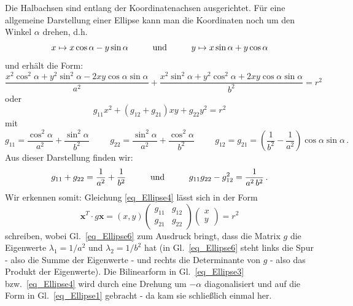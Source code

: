 Die Halbachsen sind entlang der Koordinatenachsen ausgerichtet.
F\"ur eine allgemeine Darstellung einer Ellipse kann man die Koordinaten noch um den Winkel $\alpha$
drehen, d.h.
\begin{equation}
\label{eq_Ellipse2}
        x \mapsto  x\cos \alpha  - y \sin \alpha   \hspace{1cm} {\rm und} \hspace{1cm}
        y \mapsto  x\sin \alpha + y \cos \alpha    
\end{equation}
und erh\"alt die Form:
\begin{equation}
\label{eq_Ellipse3}
             \frac{x^2 \cos^2 \alpha + y^2 \sin^2 \alpha - 2xy \cos \alpha \sin \alpha}{a^2} + 
             \frac{x^2 \sin^2 \alpha + y^2 \cos^2 \alpha + 2xy \cos \alpha \sin \alpha}{b^2} = r^2 
\end{equation}
oder
\begin{equation}
\label{eq_Ellipse4}
            g_{11} x^2 +  (g_{12}+g_{21})  xy + g_{22} y^2 = r^2 
\end{equation}
mit
\begin{equation}
\label{eq_Ellipse5}
            g_{11} = \frac{\cos^2 \alpha}{a^2} + \frac{\sin^2 \alpha}{b^2}   \hspace{1cm}
            g_{22} = \frac{\sin^2 \alpha}{a^2} + \frac{\cos^2 \alpha}{b^2}   \hspace{1cm}
            g_{12} = g_{21} = \left( \frac{1}{b^2} - \frac{1}{a^2}  \right) \cos \alpha \sin \alpha \, .
\end{equation}
Aus dieser Darstellung finden wir:
\begin{equation}
\label{eq_Ellipse6}
        g_{11}+g_{22} = \frac{1}{a^2} + \frac{1}{b^2} \hspace{1cm} {\rm und} \hspace{1cm}
        g_{11} g_{22} - g_{12}^2 = \frac{1}{a^2\,b^2}  \, .
\end{equation}
Wir erkennen somit: Gleichung \ref{eq_Ellipse4} l\"asst sich in der Form
\begin{equation}
                  \pmb{x}^T \cdot g \pmb{x} = ( x,y) 
                  \left( \begin{array}{cc} g_{11} & g_{12} \\ g_{21} & g_{22} \end{array} \right)
                  \left( \begin{array}{c} x \\ y \end{array} \right) =r^2
\end{equation}
schreiben, wobei Gl.\ \ref{eq_Ellipse6} zum Ausdruck bringt, dass die Matrix $g$ die
Eigenwerte $\lambda_1=1/a^2$ und $\lambda_2=1/b^2$ hat (in Gl.\ \ref{eq_Ellipse6} steht links
die Spur - also die Summe der Eigenwerte - und rechts die Determinante von $g$ - also das
Produkt der Eigenwerte). Die Bilinearform in Gl.\ \ref{eq_Ellipse3} bzw.\ \ref{eq_Ellipse4} wird durch
eine Drehung um $-\alpha$ diagonalisiert und auf die Form in Gl.\ \ref{eq_Ellipse1} gebracht - da
kam sie schlie\ss lich einmal her. 

